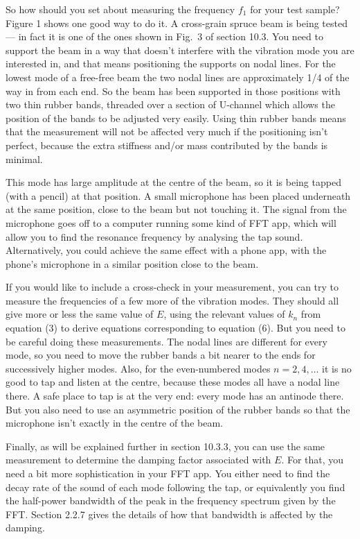   So how should you set about measuring the frequency $f_1$ for your test 
  sample? Figure 1 shows one good way to do it. A cross-grain spruce beam is 
  being tested — in fact it is one of the ones shown in Fig.\ 3 of section 
  10.3. You need to support the beam in a way that doesn’t interfere with the 
  vibration mode you are interested in, and that means positioning the supports 
  on nodal lines. For the lowest mode of a free-free beam the two nodal lines 
  are approximately 1/4 of the way in from each end. So the beam has been 
  supported in those positions with two thin rubber bands, threaded over a 
  section of U-channel which allows the position of the bands to be adjusted 
  very easily. Using thin rubber bands means that the measurement will not be 
  affected very much if the positioning isn’t perfect, because the extra 
  stiffness and/or mass contributed by the bands is minimal. 

  This mode has large amplitude at the centre of the beam, so it is being 
  tapped (with a pencil) at that position. A small microphone has been placed 
  underneath at the same position, close to the beam but not touching it. The 
  signal from the microphone goes off to a computer running some kind of FFT 
  app, which will allow you to find the resonance frequency by analysing the 
  tap sound. Alternatively, you could achieve the same effect with a phone app, 
  with the phone’s microphone in a similar position close to the beam. 

  If you would like to include a cross-check in your measurement, you can try 
  to measure the frequencies of a few more of the vibration modes. They should 
  all give more or less the same value of $E$, using the relevant values of 
  $k_n$ from equation (3) to derive equations corresponding to equation (6). 
  But you need to be careful doing these measurements. The nodal lines are 
  different for every mode, so you need to move the rubber bands a bit nearer 
  to the ends for successively higher modes. Also, for the even-numbered modes 
  $n=2,4,…$ it is no good to tap and listen at the centre, because these modes 
  all have a nodal line there. A safe place to tap is at the very end: every 
  mode has an antinode there. But you also need to use an asymmetric position 
  of the rubber bands so that the microphone isn’t exactly in the centre of the 
  beam. 

  Finally, as will be explained further in section 10.3.3, you can use the same 
  measurement to determine the damping factor associated with $E$. For that, 
  you need a bit more sophistication in your FFT app. You either need to find 
  the decay rate of the sound of each mode following the tap, or equivalently 
  you find the half-power bandwidth of the peak in the frequency spectrum given 
  by the FFT. Section 2.2.7 gives the details of how that bandwidth is affected 
  by the damping. 

